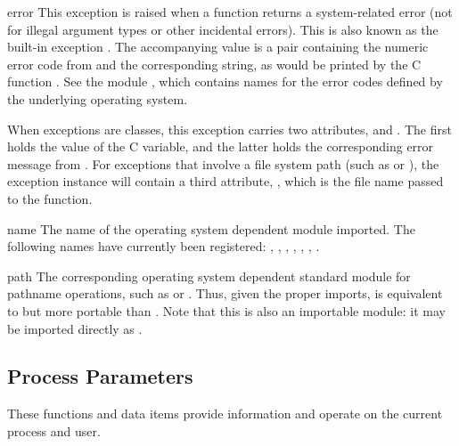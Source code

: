 \begin{excdesc}{error}
This exception is raised when a function returns a system-related
error (not for illegal argument types or other incidental errors).
This is also known as the built-in exception .  The
accompanying value is a pair containing the numeric error code from
 and the corresponding string, as would be printed by the
C function .  See the module
, which contains names for the
error codes defined by the underlying operating system.

When exceptions are classes, this exception carries two attributes,
 and .  The first holds the value of
the C  variable, and the latter holds the corresponding
error message from .  For exceptions that
involve a file system path (such as  or
), the exception instance will contain a third
attribute, , which is the file name passed to the
function.
\end{excdesc}

\begin{datadesc}{name}
The name of the operating system dependent module imported.  The
following names have currently been registered: ,
, , , ,
, .
\end{datadesc}

\begin{datadesc}{path}
The corresponding operating system dependent standard module for pathname
operations, such as  or .  Thus,
given the proper imports,  is
equivalent to but more portable than
.  Note that this is also an
importable module: it may be imported directly as
.
\end{datadesc}



\subsection{Process Parameters \label{os-procinfo}}

These functions and data items provide information and operate on the
current process and user.

